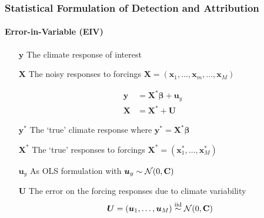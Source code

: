 \documentclass{beamer}
\newcommand{\C}{\ensuremath{\text{Cov}}}
\def\*#1{\bm{#1}}
\def\C{\textbf{\text{C}}}
\begin{document}
\begin{frame}
\frametitle{Statistical Formulation of Detection and Attribution}
\framesubtitle{Error-in-Variable (EIV)}
\begin{itemize}
\item[$\*y$] The climate response of interest 
\item[$\*X$] The \alert{noisy} responses to forcings $\*X = (\*x_1, \dots, \*x_m , \dots, \*x_M)$
\end{itemize}

\begin{block}{}
\vspace*{-\baselineskip}\setlength\belowdisplayshortskip{0pt}
\begin{align*}
\*y &= \*X^* \*\beta + \*u_y \nonumber \\
\*X &= \*X^* + \*U \:
\end{align*}
\end{block}

\begin{itemize}
\item[$\*y^*$] The `true' climate response where $\*y^* = \*X^* \*\beta$
\item[$\*X^*$] The `true' responses to forcings $\*X^* = (\*x_1^*, \dots, \*x_M^*)$
\end{itemize}

\begin{itemize}
\item[$\*u_y$] As OLS formulation with $\*u_y \sim \mathcal N(0, \C)$
\item[$\*U$] The error on the forcing responses due to climate variability
\setlength\abovedisplayskip{0pt}
\setlength\belowdisplayskip{0pt}
\[
\*U = (\*u_1, \dots, \*u_M) \stackrel{\text{iid}}{\sim} \mathcal{N}(0,\C)
\]

\end{itemize}

\end{frame}
\end{document}
